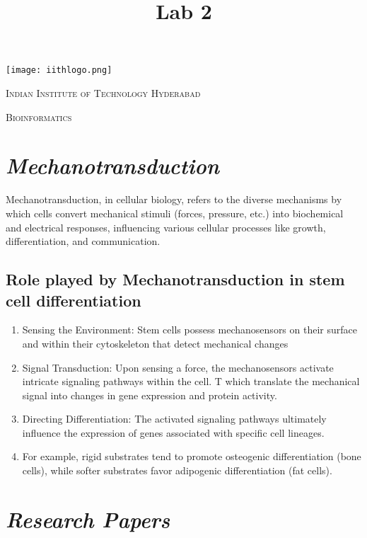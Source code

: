 \documentclass{article}
\title{Lab 2}
\begin{document}
\begin{titlepage}
  \centering
  \texttt{[image: iithlogo.png]}\par\vspace{1cm}
  {\scshape\LARGE Indian Institute of Technology Hyderabad \par}
  \vspace{1cm}
  {\scshape\Large Bioinformatics\par}
  \vspace{1.5cm}
\end{titlepage}

\maketitle
\newpage
\section{\textit{Mechanotransduction}}
Mechanotransduction, in cellular biology, refers to the diverse mechanisms by which cells convert mechanical stimuli (forces, pressure, etc.) into biochemical and electrical responses, influencing various cellular processes like growth, differentiation, and communication.
\subsection{Role played by Mechanotransduction in stem cell differentiation }
\begin{enumerate}
\item Sensing the Environment: Stem cells possess mechanosensors on their surface and within their cytoskeleton that detect mechanical changes

\item Signal Transduction: Upon sensing a force, the mechanosensors activate intricate signaling pathways within the cell. T which translate the mechanical signal into changes in gene expression and protein activity.

\item Directing Differentiation: The activated signaling pathways ultimately influence the expression of genes associated with specific cell lineages. 
\item For example, rigid substrates tend to promote osteogenic differentiation (bone cells), while softer substrates favor adipogenic differentiation (fat cells).
\end{enumerate}
\section{\textit{Research Papers}}
\end{document}

